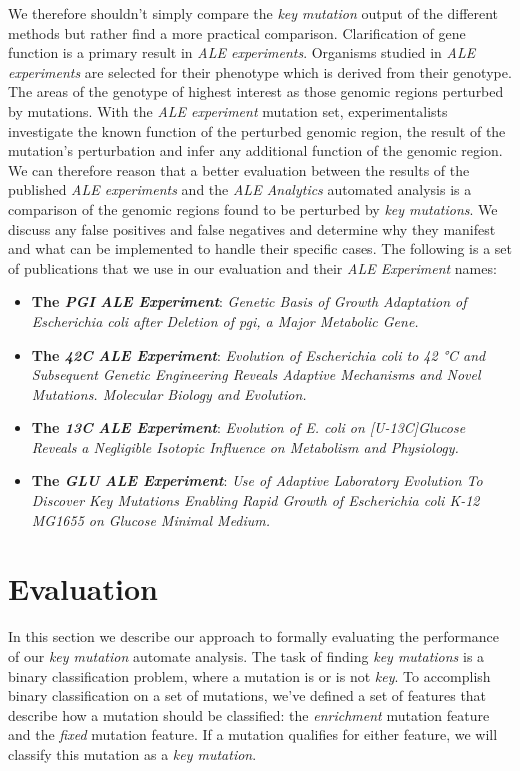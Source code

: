 \documentclass[12pt,final,masters,chapterheads]{ucsd}  %
\begin{document}
We therefore shouldn't simply compare the \textit{key mutation} output of the different methods but rather find a more practical comparison. Clarification of gene function is a primary result in \textit{ALE experiments}. Organisms studied in \textit{ALE experiments} are selected for their phenotype which is derived from their genotype. The areas of the genotype of highest interest as those genomic regions perturbed by mutations. With the \textit{ALE experiment} mutation set, experimentalists investigate the known function of the perturbed genomic region, the result of the mutation's perturbation and infer any additional function of the genomic region. We can therefore reason that a better evaluation between the results of the published \textit{ALE experiments} and the \textit{ALE Analytics} automated analysis is a comparison of the genomic regions found to be perturbed by \textit{key mutations}. We discuss any false positives and false negatives and determine why they manifest and what can be implemented to handle their specific cases. The following is a set of publications that we use in our evaluation and their \textit{ALE Experiment} names:
\begin{itemize}
\item \textbf{The \textit{PGI} \textit{ALE Experiment}}: \textit{Genetic Basis of Growth Adaptation of Escherichia coli after Deletion of pgi, a Major Metabolic Gene.} \cite{10.1371/journal.pgen.1001186}
\item \textbf{The \textit{42C} \textit{ALE Experiment}}: \textit{Evolution of Escherichia coli to 42 °C and Subsequent Genetic Engineering Reveals Adaptive Mechanisms and Novel Mutations. Molecular Biology and Evolution.} \cite{pmid25015645}
\item \textbf{The \textit{13C }\textit{ALE Experiment}}: \textit{Evolution of E. coli on [U-13C]Glucose Reveals a Negligible Isotopic Influence on Metabolism and Physiology.} \cite{pmid26964043}
\item \textbf{The \textit{GLU }\textit{ALE Experiment}}: \textit{Use of Adaptive Laboratory Evolution To Discover Key Mutations Enabling Rapid Growth of Escherichia coli K-12 MG1655 on Glucose Minimal Medium.} \cite{pmid25304508}
\end{itemize}
\section{Evaluation}
In this section we describe our approach to formally evaluating the performance of our \textit{key mutation} automate analysis. The task of finding \textit{key mutations} is a binary classification problem, where a mutation is or is not \textit{key}. To accomplish binary classification on a set of mutations, we've defined a set of features that describe how a mutation should be classified: the \textit{enrichment} mutation feature and the \textit{fixed} mutation feature. If a mutation qualifies for either feature, we will classify this mutation as a \textit{key mutation}.
\end{document}
